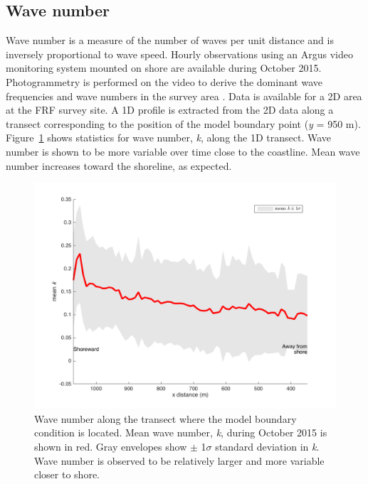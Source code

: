 \subsection{Wave number}

Wave number is a measure of the number of waves per unit distance and is inversely proportional to wave speed. Hourly observations  using an Argus video monitoring system mounted on shore are available during October 2015. Photogrammetry is performed on the video to derive the dominant wave frequencies and wave numbers in the survey area \citep{holman2013}. Data is available for a 2D area at the FRF survey site. A 1D profile is extracted from the 2D data along a transect corresponding to the position of the model boundary point (\textit{y} = 950 m). Figure~\ref{k1Dmean} shows statistics for wave number, \textit{k}, along the 1D transect. Wave number is shown to be more variable over time close to the coastline. Mean wave number increases toward the shoreline, as expected.



\begin{figure}[H]
\centering
\includegraphics[width=.55\linewidth]{img/k1Dmean_std.png}
\caption{Wave number along the transect where the model boundary condition is located. Mean wave number, \textit{k}, during October 2015 is shown in red. Gray envelopes show $\pm$ 1$\sigma$ standard deviation in \textit{k}. Wave number is observed to be relatively larger and more variable closer to shore.}
\label{k1Dmean}
\end{figure}